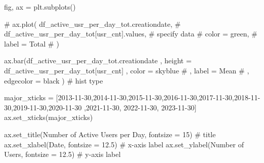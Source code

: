 \documentclass[
  letterpaper,
  DIV=11,
  numbers=noendperiod]{scrartcl}
\newenvironment{Shaded}{\begin{snugshade}}{\end{snugshade}}
\newcommand{\CommentTok}[1]{\textcolor[rgb]{0.37,0.37,0.37}{#1}}
\newcommand{\DecValTok}[1]{\textcolor[rgb]{0.68,0.00,0.00}{#1}}
\newcommand{\FloatTok}[1]{\textcolor[rgb]{0.68,0.00,0.00}{#1}}
\newcommand{\NormalTok}[1]{\textcolor[rgb]{0.00,0.23,0.31}{#1}}
\newcommand{\OperatorTok}[1]{\textcolor[rgb]{0.37,0.37,0.37}{#1}}
\newcommand{\StringTok}[1]{\textcolor[rgb]{0.13,0.47,0.30}{#1}}
\begin{document}
\begin{Shaded}
\begin{Highlighting}[]
\NormalTok{fig, ax }\OperatorTok{=}\NormalTok{ plt.subplots()}


\CommentTok{\# ax.plot( df\_active\_usr\_per\_day\_tot.creationdate, }
\CommentTok{\#         df\_active\_usr\_per\_day\_tot[\textquotesingle{}usr\_cnt\textquotesingle{}].values, \# specify data}
\CommentTok{\#         color = \textquotesingle{}green\textquotesingle{},}
\CommentTok{\#         label = \textquotesingle{}Total\textquotesingle{}}
\CommentTok{\# ) }

\NormalTok{ax.bar(df\_active\_usr\_per\_day\_tot.creationdate}
\NormalTok{    ,  height }\OperatorTok{=}\NormalTok{ df\_active\_usr\_per\_day\_tot[}\StringTok{\textquotesingle{}usr\_cnt\textquotesingle{}}\NormalTok{]}
\NormalTok{    ,  color }\OperatorTok{=} \StringTok{\textquotesingle{}skyblue\textquotesingle{}}
    \CommentTok{\# ,  label = \textquotesingle{}Mean\textquotesingle{}}
    \CommentTok{\# ,  edgecolor = \textquotesingle{}black\textquotesingle{}}
\NormalTok{      ) }\CommentTok{\# hist type}


\NormalTok{major\_xticks }\OperatorTok{=}\NormalTok{ [}\StringTok{\textquotesingle{}2013{-}11{-}30\textquotesingle{}}\NormalTok{,}\StringTok{\textquotesingle{}2014{-}11{-}30\textquotesingle{}}\NormalTok{,}\StringTok{\textquotesingle{}2015{-}11{-}30\textquotesingle{}}\NormalTok{,}\StringTok{\textquotesingle{}2016{-}11{-}30\textquotesingle{}}\NormalTok{,}\StringTok{\textquotesingle{}2017{-}11{-}30\textquotesingle{}}\NormalTok{,}\StringTok{\textquotesingle{}2018{-}11{-}30\textquotesingle{}}\NormalTok{,}\StringTok{\textquotesingle{}2019{-}11{-}30\textquotesingle{}}\NormalTok{,}\StringTok{\textquotesingle{}2020{-}11{-}30\textquotesingle{}}
\NormalTok{                ,}\StringTok{\textquotesingle{}2021{-}11{-}30\textquotesingle{}}\NormalTok{, }\StringTok{\textquotesingle{}2022{-}11{-}30\textquotesingle{}}\NormalTok{, }\StringTok{\textquotesingle{}2023{-}11{-}30\textquotesingle{}}\NormalTok{]}
\NormalTok{ax.set\_xticks(major\_xticks)}

\NormalTok{ax.set\_title(}\StringTok{\textquotesingle{}Number of Active Users per Day\textquotesingle{}}\NormalTok{, fontsize }\OperatorTok{=} \DecValTok{15}\NormalTok{) }\CommentTok{\# title}
\NormalTok{ax.set\_xlabel(}\StringTok{\textquotesingle{}Date\textquotesingle{}}\NormalTok{, fontsize }\OperatorTok{=} \FloatTok{12.5}\NormalTok{) }\CommentTok{\# x{-}axis label}
\NormalTok{ax.set\_ylabel(}\StringTok{\textquotesingle{}Number of Users\textquotesingle{}}\NormalTok{, fontsize }\OperatorTok{=} \FloatTok{12.5}\NormalTok{) }\CommentTok{\# y{-}axis label}


\end{Highlighting}
\end{Shaded}
\end{document}
